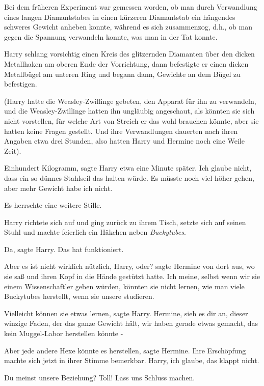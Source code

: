 Bei dem früheren Experiment war gemessen worden, ob man durch Verwandlung eines
langen Diamantstabes in einen kürzeren Diamantstab ein hängendes schweres
Gewicht anheben konnte, während es sich zusammenzog, d.h., ob man gegen die
Spannung verwandeln konnte, was man in der Tat konnte.

Harry schlang vorsichtig einen Kreis des glitzernden Diamanten über den dicken
Metallhaken am oberen Ende der Vorrichtung, dann befestigte er einen dicken
Metallbügel am unteren Ring und begann dann, Gewichte an dem Bügel zu
befestigen.

(Harry hatte die Weasley-Zwillinge gebeten, den Apparat für ihn zu verwandeln,
und die Weasley-Zwillinge hatten ihn ungläubig angeschaut, als könnten sie sich
nicht vorstellen, für welche Art von Streich er das wohl brauchen könnte, aber
sie hatten keine Fragen gestellt. Und ihre Verwandlungen dauerten nach ihren
Angaben etwa drei Stunden, also hatten Harry und Hermine noch eine Weile Zeit).

\glqq Einhundert Kilogramm\grqq{}, sagte Harry etwa eine Minute später. \glqq
Ich glaube nicht, dass ein so dünnes Stahlseil das halten würde. Es müsste noch
viel höher gehen, aber mehr Gewicht habe ich nicht.\grqq{}

Es herrschte eine weitere Stille.

Harry richtete sich auf und ging zurück zu ihrem Tisch, setzte sich auf seinen
Stuhl und machte feierlich ein Häkchen neben \glqq \emph{Buckytubes}\grqq{}.

\glqq Da\grqq{}, sagte Harry. \glqq Das hat funktioniert.\grqq{}

\glqq Aber es ist nicht wirklich nützlich, Harry, oder?\grqq{} sagte Hermine von
dort aus, wo sie saß und ihren Kopf in die Hände gestützt hatte. \glqq Ich
meine, selbst wenn wir sie einem Wissenschaftler geben würden, könnten sie nicht
lernen, wie man viele Buckytubes herstellt, wenn sie unsere studieren.\grqq{}

\glqq Vielleicht können sie etwas lernen\grqq{}, sagte Harry. \glqq Hermine,
sieh es dir an, dieser winzige Faden, der das ganze Gewicht hält, wir haben
gerade etwas gemacht, das kein Muggel-Labor herstellen könnte -\grqq{}

\glqq Aber jede andere Hexe könnte es herstellen\grqq{}, sagte Hermine. Ihre
Erschöpfung machte sich jetzt in ihrer Stimme bemerkbar. \glqq Harry, ich
glaube, das klappt nicht.\grqq{}

\glqq Du meinst unsere Beziehung? Toll! Lass uns Schluss machen.\grqq{}

